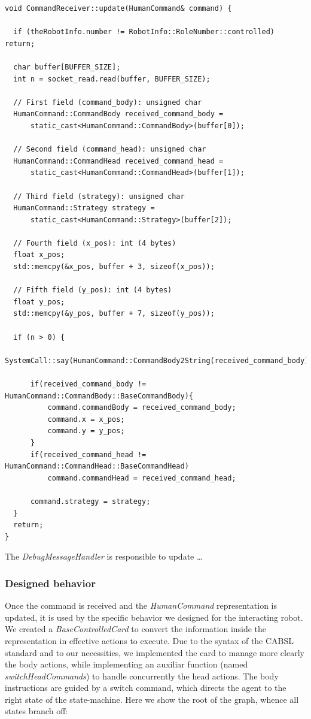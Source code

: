 \documentclass[a4paper, onecolumn, 12pt]{article}
\begin{document}
\begin{verbatim}
void CommandReceiver::update(HumanCommand& command) {
  
  if (theRobotInfo.number != RobotInfo::RoleNumber::controlled) return;
  
  char buffer[BUFFER_SIZE];
  int n = socket_read.read(buffer, BUFFER_SIZE);
  
  // First field (command_body): unsigned char
  HumanCommand::CommandBody received_command_body = 
      static_cast<HumanCommand::CommandBody>(buffer[0]);
  
  // Second field (command_head): unsigned char
  HumanCommand::CommandHead received_command_head = 
      static_cast<HumanCommand::CommandHead>(buffer[1]);
  
  // Third field (strategy): unsigned char
  HumanCommand::Strategy strategy = 
      static_cast<HumanCommand::Strategy>(buffer[2]);
  
  // Fourth field (x_pos): int (4 bytes)
  float x_pos;
  std::memcpy(&x_pos, buffer + 3, sizeof(x_pos));
  
  // Fifth field (y_pos): int (4 bytes)
  float y_pos;
  std::memcpy(&y_pos, buffer + 7, sizeof(y_pos));
  
  if (n > 0) {
      SystemCall::say(HumanCommand::CommandBody2String(received_command_body));
  
      if(received_command_body != HumanCommand::CommandBody::BaseCommandBody){
          command.commandBody = received_command_body;
          command.x = x_pos;
          command.y = y_pos;
      }
      if(received_command_head != HumanCommand::CommandHead::BaseCommandHead)
          command.commandHead = received_command_head;
  
      command.strategy = strategy;
  }
  return;
}
\end{verbatim}

The \textit{DebugMessageHandler} is responsible to update \dots
{}


\subsubsection{Designed behavior}
Once the command is received and the \textit{HumanCommand} representation is updated,
it is used by the specific behavior we designed for the interacting robot.
We created a \textit{BaseControlledCard} to convert the information inside the
representation in effective actions to execute. Due to the syntax of the CABSL standard
and to our necessities, we implemented the card to manage more clearly the body actions,
while implementing an auxiliar function (named \textit{switchHeadCommands}) to handle concurrently the head actions.
The body instructions are guided by a switch command, which directs the agent to the 
right state of the state-machine.
Here we show the root of the graph, whence all states branch off:
\end{document}
